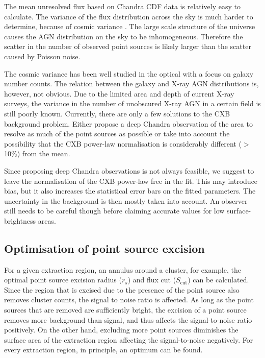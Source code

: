 \documentclass[10pt,a4paper]{article}
\begin{document}
The mean unresolved flux based on Chandra CDF data is relatively easy to calculate. The variance of the flux distribution across the sky is much harder to determine, because of cosmic variance \cite{moster2011}. The large scale structure of the universe causes the AGN distribution on the sky to be inhomogeneous. Therefore the scatter in the number of observed point sources is likely larger than the scatter caused by Poisson noise.

The cosmic variance has been well studied in the optical with a focus on galaxy number counts. The relation between the galaxy and X-ray AGN distributions is, however, not obvious. Due to the limited area and depth of current X-ray surveys, the variance in the number of unobscured X-ray AGN in a certain field is still poorly known. Currently, there are only a few solutions to the CXB background problem. Either propose a deep Chandra observation of the area to resolve as much of the point sources as possible or take into account the possibility that the CXB power-law normalisation is considerably different ($>$10\%) from the mean.

Since proposing deep Chandra observations is not always feasible, we suggest to leave the normalisation of the CXB power-law free in the fit. This may introduce bias, but it also increases the statistical error bars on the fitted parameters. The uncertainty in the background is then mostly taken into account. An observer still needs to be careful though before claiming accurate values for low surface-brightness areas. 


\subsection{Optimisation of point source excision}

For a given extraction region, an annulus around a cluster, for example, the optimal point source excision radius ($r_s$) and flux cut ($S_{\mathrm{cut}}$) can be calculated. Since the region that is excised due to the presence of the point source also removes cluster counts, the signal to noise ratio is affected. As long as the point sources that are removed are sufficiently bright, the excision of a point source removes more background than signal, and thus affects the signal-to-noise ratio positively. On the other hand, excluding more point sources diminishes the surface area of the extraction region affecting the signal-to-noise negatively. For every extraction region, in principle, an optimum can be found.
\end{document}

